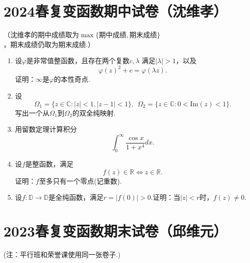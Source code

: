 \section{2024春复变函数期中试卷（沈维孝）}
（沈维孝的期中成绩取为$\max\{\text{期中成绩},\text{期末成绩}\}$，期末成绩仍取为期末成绩.）

\begin{enumerate}
    \item 设$\varphi$是非常值整函数，且存在两个复数$c,\lambda$ 满足$|\lambda|>1$，以及
    $$\varphi(z)^2+c=\varphi(\lambda z).$$
    证明：$\infty$是$\varphi$的本性奇点.

    \item 设
    $$\Omega_1=\{z\in \mathbb{C}:|z|<1,|z-1|<1\},\ \ \Omega_2=\{z\in \mathbb{C}:0<\text{Im}(z)<1\}.$$
    写出一个从$\Omega_1$到$\Omega_2$的双全纯映射.

    \item 用留数定理计算积分
    $$\int_0^{\infty}\frac{\cos x}{1+x^4}dx.$$

    \item 设$f$是整函数，满足
    $$f(z)\in\mathbb{R}\iff z\in\mathbb{R}.$$
    证明：$f$至多只有一个零点(记重数).

    \item 设$f:\mathbb{D}\to \mathbb{D}$是全纯函数，满足$r=|f(0)|>0$.证明：当$|z|<r$时，$f(z)\neq 0$.
\end{enumerate}

\section{2023春复变函数期末试卷（邱维元）}

(注：平行班和荣誉课使用同一张卷子.)

